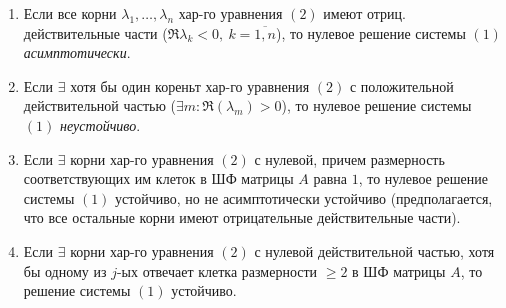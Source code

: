 \begin{theorem}\leavevmode
	\begin{enumerate}
		\item Если все корни $\lambda _1,\ldots ,\lambda _n$ хар-го уравнения $(2)$ имеют отриц. действительные части ($\Re \lambda _k < 0, \ k = \overline{1,n} $), то нулевое решение системы $(1)$ \emph{асимптотически}.
		\item Если $\exists $ хотя бы один кореньт хар-го уравнения $(2)$ с положительной действительной частью ($\exists m : \Re (\lambda _m)> 0$), то нулевое решение системы $(1)$ \emph{неустойчиво}.
		\item Если $\exists $ корни хар-го уравнения $(2)$ с нулевой, причем размерность соответствующих им клеток в ШФ матрицы $A$ равна $1$, то нулевое решение системы $(1)$ устойчиво, но не асимптотически устойчиво (предполагается, что все остальные корни имеют отрицательные действительные части).
		\item Если $\exists $ корни хар-го уравнения $(2)$ с нулевой действительной частью, хотя бы одному из $j$-ых отвечает клетка размерности $\geqslant 2$ в ШФ матрицы $A$, то решение системы $(1)$ устойчиво.
	\end{enumerate}
\end{theorem}

